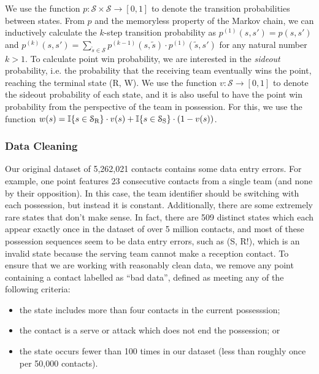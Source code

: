 \documentclass[USenglish]{article}
\theoremstyle{dgthm}
\theoremstyle{dgdef}
\begin{document}
{\color{blue}
We use the function $p: \mathcal{S} \times \mathcal{S} \rightarrow [0, 1]$ to denote the transition probabilities between states. From $p$ and the memoryless property of the Markov chain, we can inductively calculate the $k$-step transition probability as $p^{(1)}(s, s') = p(s, s')$ and $p^{(k)}(s, s') = \sum_{\tilde s \in \mathcal{S}}p^{(k-1)}(s, \tilde s) \cdot p^{(1)}(\tilde s, s')$ for any natural number $k > 1$. To calculate point win probability, we are interested in the {\it sideout} probability, i.e. the probability that the receiving team eventually wins the point, reaching the terminal state (R, W). We use the function $v: \mathcal{S} \rightarrow [0, 1]$ to denote the sideout probability of each state, and it is also useful to have the point win probability from the perspective of the team in possession. For this, we use the function $w(s) = \mathbb{I}\{s \in \mathcal{S}_{\mbox{\scriptsize R}}\} \cdot v(s) + \mathbb{I}\{s \in \mathcal{S}_{\mbox{\scriptsize S}}\} \cdot (1 - v(s))$.

\subsubsection{Data Cleaning}
\label{sec:data-cleaning}

Our original dataset of 5,262,021 contacts contains some data entry errors. For example, one point features 23 consecutive contacts from a single team (and none by their opposition). In this case, the team identifier should be switching with each possession, but instead it is constant. Additionally, there are some extremely rare states that don't make sense. In fact, there are 509 distinct states which each appear exactly once in the dataset of over 5 million contacts, and most of these possession sequences seem to be data entry errors, such as (S, R!), which is an invalid state because the serving team cannot make a reception contact. To ensure that we are working with reasonably clean data, we remove any point containing a contact labelled as ``bad data'', defined as meeting any of the following criteria:
\begin{itemize}
  \item the state includes more than four contacts in the current possesssion;
  \item the contact is a serve or attack which does not end the possession; or
  \item the state occurs fewer than 100 times in our dataset (less than roughly once per 50,000 contacts).
\end{itemize}

}
\end{document}
